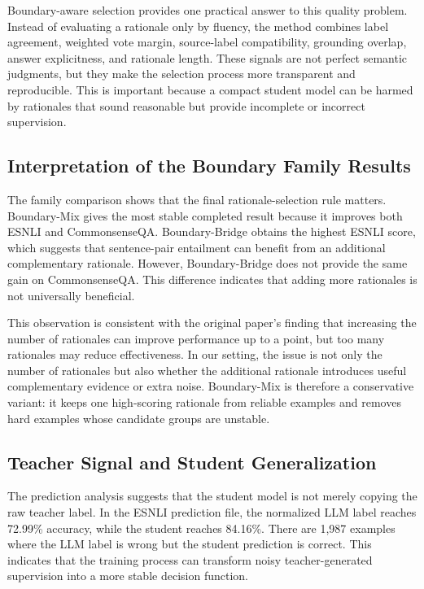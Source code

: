 Boundary-aware selection provides one practical answer to this quality problem. Instead of evaluating a rationale only by fluency, the method combines label agreement, weighted vote margin, source-label compatibility, grounding overlap, answer explicitness, and rationale length. These signals are not perfect semantic judgments, but they make the selection process more transparent and reproducible. This is important because a compact student model can be harmed by rationales that sound reasonable but provide incomplete or incorrect supervision.

\subsection{Interpretation of the Boundary Family Results}
\label{sec:discussion-family}

The family comparison shows that the final rationale-selection rule matters. Boundary-Mix gives the most stable completed result because it improves both ESNLI and CommonsenseQA. Boundary-Bridge obtains the highest ESNLI score, which suggests that sentence-pair entailment can benefit from an additional complementary rationale. However, Boundary-Bridge does not provide the same gain on CommonsenseQA. This difference indicates that adding more rationales is not universally beneficial.

This observation is consistent with the original paper's finding that increasing the number of rationales can improve performance up to a point, but too many rationales may reduce effectiveness. In our setting, the issue is not only the number of rationales but also whether the additional rationale introduces useful complementary evidence or extra noise. Boundary-Mix is therefore a conservative variant: it keeps one high-scoring rationale from reliable examples and removes hard examples whose candidate groups are unstable.

\subsection{Teacher Signal and Student Generalization}
\label{sec:discussion-student}

The prediction analysis suggests that the student model is not merely copying the raw teacher label. In the ESNLI prediction file, the normalized LLM label reaches 72.99\% accuracy, while the student reaches 84.16\%. There are 1,987 examples where the LLM label is wrong but the student prediction is correct. This indicates that the training process can transform noisy teacher-generated supervision into a more stable decision function.

